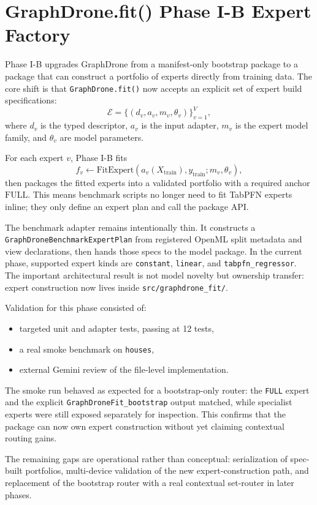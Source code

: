 \section{GraphDrone.fit() Phase I-B Expert Factory}

Phase I-B upgrades GraphDrone from a manifest-only bootstrap package to a package that can construct a portfolio of experts directly from training data. The core shift is that \texttt{GraphDrone.fit()} now accepts an explicit set of expert build specifications:
\[
\mathcal{E} = \{(d_v, a_v, m_v, \theta_v)\}_{v=1}^V,
\]
where \(d_v\) is the typed descriptor, \(a_v\) is the input adapter, \(m_v\) is the expert model family, and \(\theta_v\) are model parameters.

For each expert \(v\), Phase I-B fits
\[
f_v \leftarrow \mathrm{FitExpert}(a_v(X_{\mathrm{train}}), y_{\mathrm{train}}; m_v, \theta_v),
\]
then packages the fitted experts into a validated portfolio with a required anchor \(\mathrm{FULL}\). This means benchmark scripts no longer need to fit TabPFN experts inline; they only define an expert plan and call the package API.

The benchmark adapter remains intentionally thin. It constructs a \texttt{GraphDroneBenchmarkExpertPlan} from registered OpenML split metadata and view declarations, then hands those specs to the model package. In the current phase, supported expert kinds are \texttt{constant}, \texttt{linear}, and \texttt{tabpfn\_regressor}. The important architectural result is not model novelty but ownership transfer: expert construction now lives inside \texttt{src/graphdrone\_fit/}.

Validation for this phase consisted of:
\begin{itemize}
\item targeted unit and adapter tests, passing at 12 tests,
\item a real smoke benchmark on \texttt{houses},
\item external Gemini review of the file-level implementation.
\end{itemize}

The smoke run behaved as expected for a bootstrap-only router: the \texttt{FULL} expert and the explicit \texttt{GraphDroneFit\_bootstrap} output matched, while specialist experts were still exposed separately for inspection. This confirms that the package can now own expert construction without yet claiming contextual routing gains.

The remaining gaps are operational rather than conceptual: serialization of spec-built portfolios, multi-device validation of the new expert-construction path, and replacement of the bootstrap router with a real contextual set-router in later phases.
